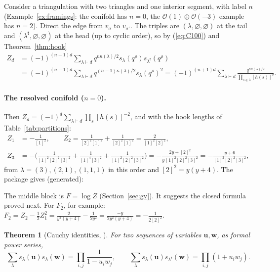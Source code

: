 \documentclass[11pt]{article}
\theoremstyle{plain}
\newtheorem{theorem}{Theorem}[section]
\theoremstyle{definition}
\theoremstyle{remark}
\newcommand{\vu}{\mathbf{u}}
\newcommand{\vw}{\mathbf{w}}
\newcommand{\qrho}{q^{\rho}}
\newcommand{\es}{\varnothing}
\newcommand{\tr}{{\mathsf t}}
\newcommand{\lt}[1]{#1^{\tr}}
\begin{document}
Consider a triangulation with two triangles and one interior segment, with label $n$
(Example~\ref{ex:framings}: the conifold has $n=0$, the $\mathcal O(1)\oplus\mathcal O(-3)$
example has $n=2$). Direct the edge from $v_\sigma$ to $v_{\sigma'}$. The triples are
$(\lambda,\es,\es)$ at the tail and $(\lt\lambda,\es,\es)$ at the head (up to cyclic order), so
by (\ref{eq:C100}) and Theorem~\ref{thm:hook}
\begin{equation}\label{eq:oneedge}
\begin{aligned}
Z_d&=(-1)^{(n+1)d}\sum_{\lambda\vdash d}q^{n\kappa(\lambda)/2}s_\lambda(\qrho)s_{\lt\lambda}(\qrho)\\
&=(-1)^{(n+1)d}\sum_{\lambda\vdash d}q^{(n-1)\kappa(\lambda)/2}s_\lambda(\qrho)^2
=(-1)^{(n+1)d}\sum_{\lambda\vdash d}\frac{q^{n\kappa(\lambda)/2}}{\prod_{s\in\lambda}[h(s)]^2}.
\end{aligned}
\end{equation}

\paragraph{The resolved conifold ($n=0$).} Then $Z_d=(-1)^d\sum_{\lambda\vdash d}\prod_s[h(s)]^{-2}$,
and with the hook lengths of Table~\ref{tab:partitions}:
\begin{align}
Z_1&=-\frac1{[1]^2},\qquad
Z_2=\frac1{[2]^2[1]^2}+\frac1{[2]^2[1]^2}=\frac2{[1]^2[2]^2},\\
Z_3&=-\Big(\frac1{[1]^2[2]^2[3]^2}+\frac1{[1]^4[3]^2}+\frac1{[1]^2[2]^2[3]^2}\Big)
=-\frac{2y+[2]^2}{y\,[1]^2[2]^2[3]^2}=-\frac{y+6}{[1]^2[2]^2[3]^2},
\end{align}
from $\lambda=(3),(2,1),(1,1,1)$ in this order and $[2]^2=y(y+4)$. The package gives (generated):

The middle block is $F=\log Z$ (Section~\ref{sec:gv}). It suggests the closed formula proved
next. For $F_2$, for example: $F_2=Z_2-\frac12Z_1^2=\frac{2}{y^2(y+4)}-\frac1{2y^2}
=\frac{-y}{2y^2(y+4)}=-\frac1{2[2]^2}$.

\begin{theorem}[Cauchy identities, {\cite[I.4]{Macdonald}}]\label{thm:cauchy}
For two sequences of variables $\vu,\vw$, as formal power series,
\begin{equation}\label{eq:cauchy}
\sum_\lambda s_\lambda(\vu)s_\lambda(\vw)=\prod_{i,j}\frac1{1-u_iw_j},\qquad
\sum_\lambda s_\lambda(\vu)s_{\lt\lambda}(\vw)=\prod_{i,j}(1+u_iw_j).
\end{equation}
\end{theorem}
\end{document}
